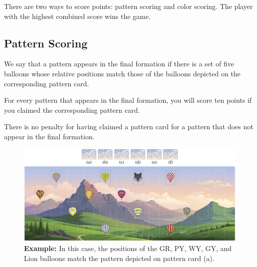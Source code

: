 \documentclass[a6paper, 11pt, parskip=half, DIV=15]{scrartcl}
\begin{document}
There are two ways to score points: pattern scoring and color scoring. The player with the highest combined score wins the game.


\newpage
\enlargethispage{1.75\baselineskip}

\subsection*{Pattern Scoring}
We say that a pattern appears in the final formation if there is a set of five balloons whose relative positions match those of the balloons depicted on the corresponding pattern card. 

For every pattern that appears in the final formation, you will score ten points if you claimed the corresponding pattern card.

There is no penalty for having claimed a pattern card for a pattern that does not appear in the final formation.

\vfill

\begin{figure}[hb]
\centering
\includegraphics[scale=0.115]{Images/pattern_scoring_diagram.png}
\caption*{\textbf{Example:} In this case, the positions of the {\setmainfont{Playball}GR}, {\setmainfont{Playball}PY}, {\setmainfont{Playball}WY}, {\setmainfont{Playball}GY}, and Lion balloons match the pattern depicted on pattern card (a).}
\end{figure}

\newpage
\enlargethispage{1.75\baselineskip}
\end{document}
